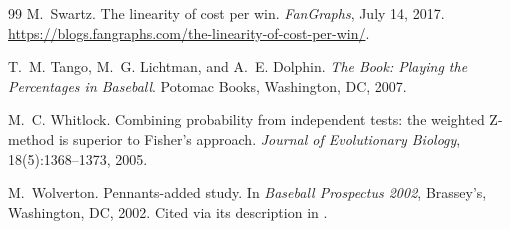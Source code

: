 \documentclass[11pt,letterpaper]{article}
\theoremstyle{plain}
\theoremstyle{definition}
\theoremstyle{remark}
\begin{document}
\begin{thebibliography}{99}
M.~Swartz.
\newblock The linearity of cost per win.
\newblock \emph{FanGraphs}, July 14, 2017. \url{https://blogs.fangraphs.com/the-linearity-of-cost-per-win/}.

T.~M. Tango, M.~G. Lichtman, and A.~E. Dolphin.
\newblock \emph{The Book: Playing the Percentages in Baseball}.
\newblock Potomac Books, Washington, DC, 2007.

M.~C. Whitlock.
\newblock Combining probability from independent tests: the weighted {Z}-method is superior to {Fisher's} approach.
\newblock \emph{Journal of Evolutionary Biology}, 18(5):1368--1373, 2005.

M.~Wolverton.
\newblock Pennants-added study.
\newblock In \emph{Baseball Prospectus 2002}, Brassey's, Washington, DC, 2002. Cited via its description in \cite{gassko2007}.

\end{thebibliography}
\end{document}
